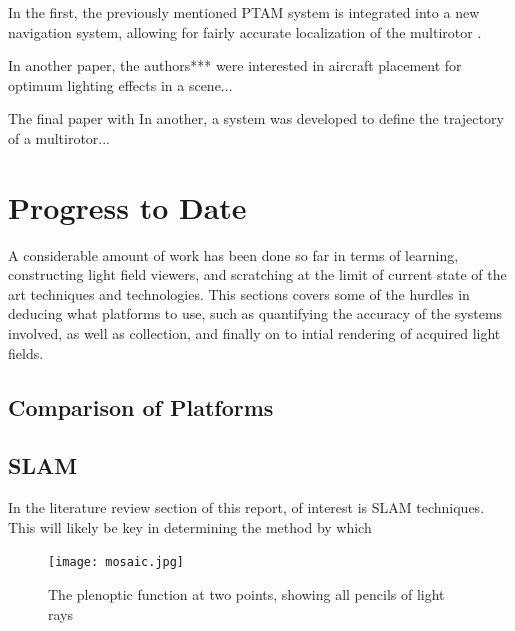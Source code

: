 \documentclass[12pt]{report}
\begin{document}
In the first, the previously mentioned PTAM system is integrated into a new navigation system, allowing for fairly accurate localization of the multirotor \cite{Engel12}.

In another paper, the authors*** were interested in aircraft placement for optimum lighting effects in a scene... \cite{Srikanth14}

The final paper with In another, a system was developed to define the trajectory of a multirotor... \cite{Roberts16}



\chapter*{Progress to Date}
A considerable amount of work has been done so far in terms of learning, constructing light field viewers, and scratching at the limit of current state of the art techniques and technologies. This sections covers some of the hurdles in deducing what platforms to use, such as quantifying the accuracy of the systems involved, as well as collection, and finally on to intial rendering of acquired light fields.
\section*{Comparison of Platforms}
\section*{SLAM}
In the literature review section of this report, of interest is SLAM techniques. This will likely be key in determining the method by which 

\begin{figure}[!ht]
	\centering
	\texttt{[image: mosaic.jpg]}
	\caption{The plenoptic function at two points, showing all pencils of light rays \cite{Adelson91}}
	\label{fig:parameterization_visual}
\end{figure}
\end{document}
